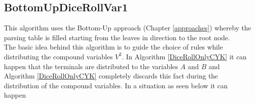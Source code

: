 \subsection{BottomUpDiceRollVar1}
This algorithm uses the Bottom-Up approach (Chapter \ref{approaches}) whereby the parsing table is filled starting from the leaves in direction to the root node.\\
The basic idea behind this algorithm is to guide the choice of rules while distributing the compound variables $V^2$. In Algorithm \ref{DiceRollOnlyCYK} it can happen that the terminals are distributed to the variables $A$ and $B$ and Algorithm \ref{DiceRollOnlyCYK} completely discards this fact during the distribution of the compound variables. In a situation as seen below it can happen \\
\noindent
\begin{figure}[h]
	\begin{minipage}{6in}
		\centering
		\hspace*{.2in}
\end{minipage}
\end{figure}
